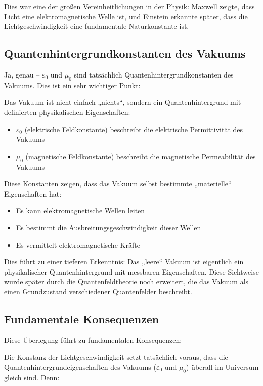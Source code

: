 \documentclass[12pt,a4paper]{article}
\begin{document}
	Dies war eine der großen Vereinheitlichungen in der Physik: Maxwell zeigte, dass Licht eine elektromagnetische Welle ist, und Einstein erkannte später, dass die Lichtgeschwindigkeit eine fundamentale Naturkonstante ist.
	
	\subsection{Quantenhintergrundkonstanten des Vakuums}
	
	Ja, genau – \(\varepsilon_0\) und \(\mu_0\) sind tatsächlich Quantenhintergrundkonstanten des Vakuums. Dies ist ein sehr wichtiger Punkt:
	
	Das Vakuum ist nicht einfach „nichts“, sondern ein Quantenhintergrund mit definierten physikalischen Eigenschaften:
	
	\begin{itemize}
		\item \(\varepsilon_0\) (elektrische Feldkonstante) beschreibt die elektrische Permittivität des Vakuums
		\item \(\mu_0\) (magnetische Feldkonstante) beschreibt die magnetische Permeabilität des Vakuums
	\end{itemize}
	
	Diese Konstanten zeigen, dass das Vakuum selbst bestimmte „materielle“ Eigenschaften hat:
	\begin{itemize}
		\item Es kann elektromagnetische Wellen leiten
		\item Es bestimmt die Ausbreitungsgeschwindigkeit dieser Wellen
		\item Es vermittelt elektromagnetische Kräfte
	\end{itemize}
	
	Dies führt zu einer tieferen Erkenntnis: Das „leere“ Vakuum ist eigentlich ein physikalischer Quantenhintergrund mit messbaren Eigenschaften. Diese Sichtweise wurde später durch die Quantenfeldtheorie noch erweitert, die das Vakuum als einen Grundzustand verschiedener Quantenfelder beschreibt.
	
	\subsection{Fundamentale Konsequenzen}
	
	Diese Überlegung führt zu fundamentalen Konsequenzen:
	
	Die Konstanz der Lichtgeschwindigkeit setzt tatsächlich voraus, dass die Quantenhintergrundeigenschaften des Vakuums (\(\varepsilon_0\) und \(\mu_0\)) überall im Universum gleich sind. Denn:
	
\end{document}

